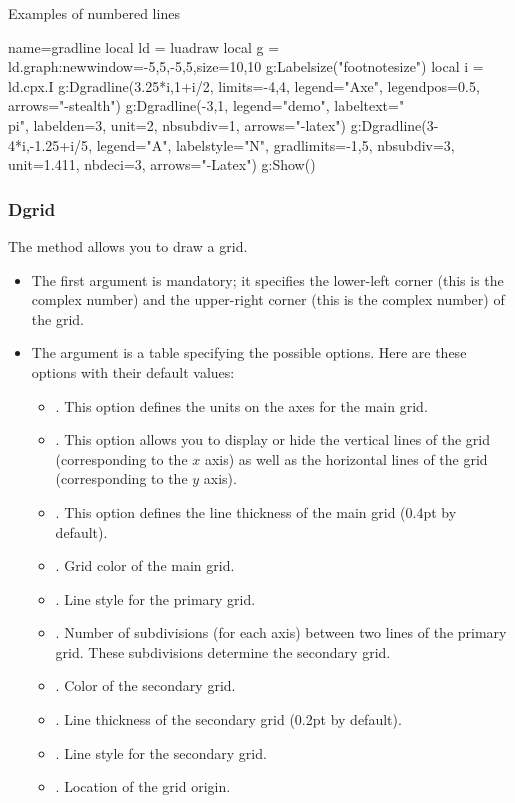 \begin{demo}{Examples of numbered lines}
\begin{luadraw}{name=gradline}
local ld = luadraw
local g = ld.graph:new{window={-5,5,-5,5},size={10,10}}
g:Labelsize("footnotesize")
local i = ld.cpx.I
g:Dgradline({3.25*i,1+i/2}, {limits={-4,4}, legend="Axe", legendpos=0.5, arrows="-stealth"})
g:Dgradline({-3,1}, {legend="demo", labeltext="\\pi", labelden=3, unit=2, nbsubdiv=1, arrows="-latex"})
g:Dgradline({3-4*i,-1.25+i/5}, {legend="A", labelstyle="N", gradlimits={-1,5},
nbsubdiv=3, unit=1.411, nbdeci=3, arrows="-Latex"})
g:Show()
\end{luadraw}
\end{demo}

\subsubsection{Dgrid}

The  method allows you to draw a grid.
\begin{itemize}
    \item The first argument is mandatory; it specifies the lower-left corner (this is the  complex number) and the upper-right corner (this is the  complex number) of the grid.
    \item The  argument is a table specifying the possible options. Here are these options with their default values:
\begin{itemize}
    \item {}. ​​This option defines the units on the axes for the main grid.
    \item {}. This option allows you to display or hide the vertical lines of the grid (corresponding to the $x$ axis) as well as the horizontal lines of the grid (corresponding to the $y$ axis).
    \item {}. This option defines the line thickness of the main grid (0.4pt by default).
    \item {}. Grid color of the main grid.
    \item {}. Line style for the primary grid.
    \item {}. Number of subdivisions (for each axis) between two lines of the primary grid. These subdivisions determine the secondary grid.
    \item {}. Color of the secondary grid.
    \item {}. Line thickness of the secondary grid (0.2pt by default).
    \item {}. Line style for the secondary grid.
    \item {}. Location of the grid origin.
\end{itemize}
\end{itemize}

